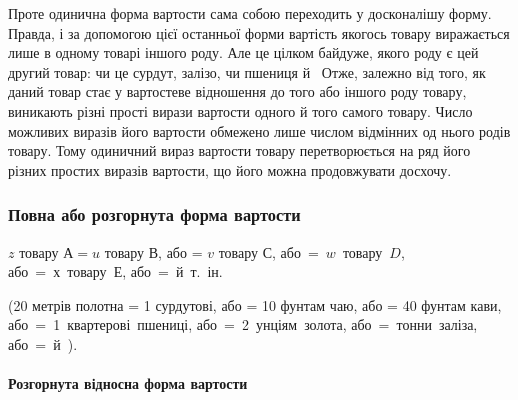 Проте одинична форма вартости сама собою переходить у досконалішу
форму. Правда, і за допомогою цієї останньої форми вартість
якогось товару виражається лише в одному товарі іншого
роду. Але це цілком байдуже, якого роду є цей другий товар: чи
це сурдут, залізо, чи пшениця й~ Отже, залежно від того,
як даний товар стає у вартостеве відношення до того або іншого
роду товару, виникають різні прості вирази вартости одного й
того самого товару. Число можливих виразів його вартости
обмежено лише числом відмінних од нього родів товару. Тому
одиничний вираз вартости товару перетворюється на ряд його
різних простих виразів вартости, що його можна продовжувати
досхочу.

\subsubsection{Повна або розгорнута форма вартости}
\begin{center}
$z$ товару $А = u$ товару $В$, або = $v$ товару $С$, \mbox{або = $w$ товару $D$},\\
\mbox{або = $х$ товару $Е$},  \mbox{або = й т. ін}.

{\small (20 метрів полотна = 1 сурдутові, або = 10 фунтам чаю, або = 40 фунтам
кави, \mbox{або = 1 квартерові пшениці}, \mbox{або = 2 унціям золота},
\mbox{або =  тонни заліза}, \mbox{або = й~).}}
\end{center}

\paragraph{Розгорнута відносна форма вартости}

